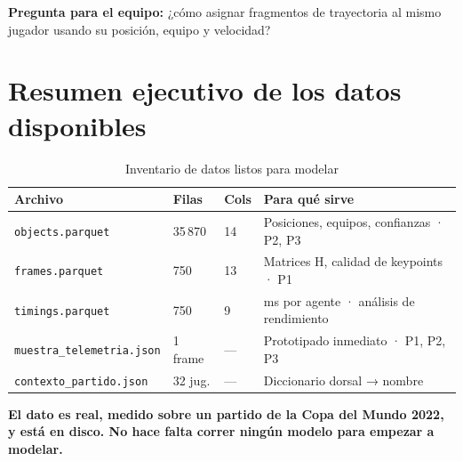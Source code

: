 \documentclass[11pt,a4paper]{article}
\begin{document}
\textbf{Pregunta para el equipo:} ¿cómo asignar fragmentos de trayectoria
al mismo jugador usando su posición, equipo y velocidad?

\section{Resumen ejecutivo de los datos disponibles}

\begin{table}[H]
\centering
\caption{Inventario de datos listos para modelar}
\label{tab:inventario}
\begin{tabular}{p{4.5cm} p{2cm} p{2cm} p{5.5cm}}
\toprule
\textbf{Archivo} & \textbf{Filas} & \textbf{Cols} & \textbf{Para qué sirve} \\
\midrule
\texttt{objects.parquet} & 35\,870 & 14 & Posiciones, equipos, confianzas · P2, P3 \\
\texttt{frames.parquet}  &    750  & 13 & Matrices H, calidad de keypoints · P1 \\
\texttt{timings.parquet} &    750  &  9 & ms por agente · análisis de rendimiento \\
\texttt{muestra\_telemetria.json} & 1 frame & — & Prototipado inmediato · P1, P2, P3 \\
\texttt{contexto\_partido.json}   & 32 jug. & — & Diccionario dorsal → nombre \\
\bottomrule
\end{tabular}
\end{table}

\begin{notabox}
\textbf{El dato es real, medido sobre un partido de la Copa del Mundo 2022,
y está en disco. No hace falta correr ningún modelo para empezar a modelar.}
\end{notabox}
\end{document}
